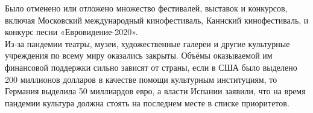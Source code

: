 \documentclass[a4paper, 12pt]{extarticle}
\begin{document}
Было отменено или отложено множество фестивалей, выставок и конкурсов, включая
Московский международный кинофестиваль, Каннский кинофестиваль, и конкурс песни
«Евровидение-2020».
\\

Из-за пандемии театры, музеи, художественные галереи и другие культурные
учреждения по всему миру оказались закрыты. Объёмы оказываемой им финансовой
поддержки сильно зависят от страны, если в США было выделено 200 миллионов
долларов в качестве помощи культурным институциям, то Германия выделила 50
миллиардов евро, а власти Испании заявили, что на время пандемии культура
должна стоять на последнем месте в списке приоритетов.

\newpage
{}
{}

\end{document}
